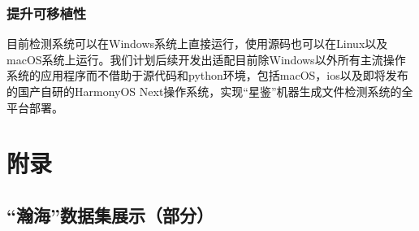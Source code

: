 \documentclass[a4paper]{report}
\begin{document}
\subsection{提升可移植性}
目前检测系统可以在Windows系统上直接运行，使用源码也可以在Linux以及macOS系统上运行。我们计划后续开发出适配目前除Windows以外所有主流操作系统的应用程序而不借助于源代码和python环境，包括macOS，ios以及即将发布的国产自研的HarmonyOS Next操作系统，实现“星鉴”机器生成文件检测系统的全平台部署。



\chapter*{附录}
\section*{“瀚海”数据集展示（部分）}
\end{document}
